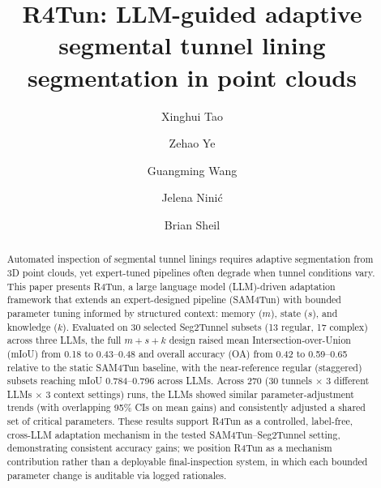 \documentclass[a4paper,fleqn]{cas-dc}
\begin{document}
\let\WriteBookmarks\relax
\def\floatpagepagefraction{1}
\def\textpagefraction{.001}




{

\title[mode=title]{R4Tun: LLM-guided adaptive segmental tunnel lining segmentation in point clouds}

\author[1]{Xinghui Tao}

\author[2]{Zehao Ye}


\author[1]{Guangming Wang}
\cormark[1]

\author[2]{Jelena Nini\'{c}}

\author[1]{Brian Sheil}






\begin{abstract}
Automated inspection of segmental tunnel linings requires adaptive segmentation from 3D point clouds, yet expert-tuned pipelines often degrade when tunnel conditions vary. This paper presents R4Tun, a large language model (LLM)-driven adaptation framework that extends an expert-designed pipeline (SAM4Tun) with bounded parameter tuning informed by structured context: memory ($m$), state ($s$), and knowledge ($k$). Evaluated on 30 selected Seg2Tunnel subsets (13 regular, 17 complex) across three LLMs, the full $m+s+k$ design raised mean Intersection-over-Union (mIoU) from 0.18 to 0.43--0.48 and overall accuracy (OA) from 0.42 to 0.59--0.65 relative to the static SAM4Tun baseline, with the near-reference regular (staggered) subsets reaching mIoU 0.784--0.796 across LLMs. Across 270 (30 tunnels $\times$ 3 different LLMs $\times$ 3 context settings) runs, the LLMs showed similar parameter-adjustment trends (with overlapping 95\% CIs on mean gains) and consistently adjusted a shared set of critical parameters. These results support R4Tun as a controlled, label-free, cross-LLM adaptation mechanism in the tested SAM4Tun--Seg2Tunnel setting, demonstrating consistent accuracy gains; we position R4Tun as a mechanism contribution rather than a deployable final-inspection system, in which each bounded parameter change is auditable via logged rationales.
\end{abstract}


}
\end{document}
